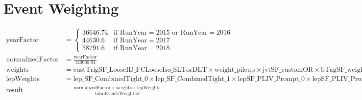 \section{Event Weighting}
\label{appendix:weights}

\begin{align*}
    \text{yearFactor}       & = \begin{cases}
                                    36646.74 & \text{if } \text{RunYear} = 2015 \text{ or } \text{RunYear} = 2016 \\
                                    44630.6  & \text{if } \text{RunYear} = 2017                                   \\
                                    58791.6  & \text{if } \text{RunYear} = 2018
                                \end{cases}                                                                                                                                            \\
    \text{normalizedFactor} & = \frac{\text{yearFactor}}{140068.94}                                                                                                                                                                                      \\
    \text{weights}          & = \text{custTrigSF\_LooseID\_FCLooseIso\_SLTorDLT} \times \text{weight\_pileup} \times \text{jvtSF\_customOR} \times \text{bTagSF\_weight\_DL1r\_85} \times \text{XXX\_VV\_NJET} \times \text{weight\_mc} \times \text{xs} \\
    \text{lepWeights}       & = \text{lep\_SF\_CombinedTight\_0} \times \text{lep\_SF\_CombinedTight\_1} \times \text{lepSF\_PLIV\_Prompt\_0} \times \text{lepSF\_PLIV\_Prompt\_1}                                                                       \\
    \text{result}           & = \frac{\text{normalizedFactor} \times \text{weights} \times \text{lepWeights}}{\text{totalEventsWeighted}}
\end{align*}

